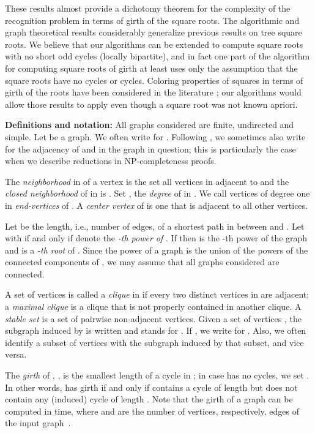 \documentclass[proceedings]{stacs}
\newlength{\ai}
\begin{document}
These results almost provide a dichotomy theorem for the complexity
of the recognition problem in terms of girth of the square roots.
The algorithmic and graph theoretical results considerably
generalize previous results on tree square roots.
We believe that our algorithms can be extended to
compute square roots with no short odd cycles (locally bipartite),
and in fact one part of the algorithm for computing square
roots of girth at least  uses only the assumption that
the square roots have no  cycles or  cycles.
Coloring properties of squares in terms of girth of the roots
have been considered in the literature \cite{AloMoh,CraKim,Havet};
our algorithms would allow those results to apply even
though a square root was not known apriori.

{\bf Definitions and notation:}
All graphs considered are finite, undirected and simple. Let  be a graph.
We often write  for . Following \cite{MotSud1994,LauCor2004}, we sometimes
also write  for the adjacency of  and  in the graph in question; this
is particularly the case when we describe reductions in NP-completeness proofs.

The \emph{neighborhood}  in 
of a vertex  is the set all vertices in  adjacent to  and the
\emph{closed neighborhood} of  in  is . Set ,
the \emph{degree} of  in . We call vertices of degree one in  \emph{end-vertices}
of . A \emph{center vertex} of  is one that is adjacent to all other vertices.

Let  be the length, i.e., number of edges, of a shortest path in  between
 and . Let  with  if and only if  denote
the {\em -th power of }. If  then  is the -th power of the graph  and
 is a \emph{-th root} of . Since the power of a graph  is the union of the powers
of the connected components of , we may assume that all graphs considered are connected.

A set of vertices  is called a \emph{clique} in  if every two
distinct vertices in  are adjacent; a \emph{maximal clique} is a clique that is not
properly contained in another clique. A \emph{stable set} is a set of pairwise non-adjacent
vertices. Given a set of vertices , the subgraph induced by  is written
 and  stands for . If , we write
 for . Also, we often identify a subset of vertices with the
subgraph induced by that subset, and vice versa.

The \emph{girth} of , , is the smallest length of a cycle in ; in
case  has no cycles, we set . In other words,  has girth
 if and only if  contains a cycle of length  but does not contain any (induced)
cycle of length .
Note that the girth of a graph can be computed
in  time, where  and  are the number of vertices, respectively, edges of the input
graph~\cite{ItaRod}.
\end{document}
